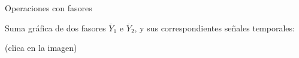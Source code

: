 \documentclass[aspectratio=169, usenames,svgnames,dvipsnames]{beamer}
\begin{document}

\begin{frame}{Operaciones con fasores} \label{diapo:gif_fasores} 
    
    \vspace{3mm}
    Suma gráfica de dos fasores $\overline{Y}_1$ e $\overline{Y}_2$, y sus correspondientes señales temporales:
    
    (\alert{clica en la imagen})

    \begin{center}
    \end{center}
\end{frame}

\end{document}
